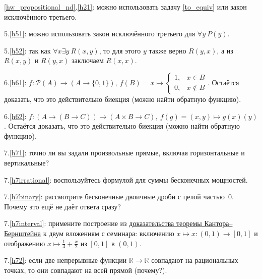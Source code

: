 \documentclass{article}
\newcommand{\R}{\mathbb{R}}
\begin{document}
\ref*{hw_propositional_nd}.\ref{h21}: можно использовать задачу \ref{to_equiv} или закон исключённого третьего.

5.\ref{h51}: можно использовать закон исключённого третьего для $\forall y~P(y)$.

5.\ref{h52}: так как $\forall x \exists y~R(x,y)$, то для этого $y$ также верно $R(y,x)$, а из $R(x,y)$ и $R(y,x)$ заключаем $R(x,x)$.

6.\ref{h61}: $f: \mathcal{P}(A) \to (A \to \{0,1\}),~f(B) = x \mapsto \begin{cases} 1, & x \in B \\ 0, & x \notin B \end{cases}$. Остаётся доказать, что это действительно биекция (можно найти обратную функцию).

6.\ref{h62}: $f: (A \to (B \to C)) \to (A \times B \to C),~f(g) = (x,y) \mapsto g(x)(y)$. Остаётся доказать, что это действительно биекция (можно найти обратную функцию).

7.\ref{h71}: точно ли вы задали произвольные прямые, включая горизонтальные и вертикальные?

7.\ref{h7irrational}: воспользуйтесь формулой для суммы бесконечных мощностей.

7.\ref{h7binary}: рассмотрите бесконечные двоичные дроби с целой частью~$0$. Почему это ещё не даёт ответа сразу?

7.\ref{h7interval}: примените построение из \href{https://ru.wikipedia.org/wiki/%D0%A2%D0%B5%D0%BE%D1%80%D0%B5%D0%BC%D0%B0_%D0%9A%D0%B0%D0%BD%D1%82%D0%BE%D1%80%D0%B0_%E2%80%94_%D0%91%D0%B5%D1%80%D0%BD%D1%88%D1%82%D0%B5%D0%B9%D0%BD%D0%B0#%D0%94%D0%BE%D0%BA%D0%B0%D0%B7%D0%B0%D1%82%D0%B5%D0%BB%D1%8C%D1%81%D1%82%D0%B2%D0%BE}{доказательства теоремы Кантора--Бернштейна} к двум вложениям с семинара: включению $x\mapsto x\colon (0,1)\to[0,1]$ и отображению $x\mapsto\frac14+\frac{x}{2}$ из $[0,1]$ в $(0,1)$.

7.\ref{h72}: если две непрерывные функции $\R \to \R$ совпадают на рациональных точках, то они совпадают на всей прямой (почему?).
\end{document}

